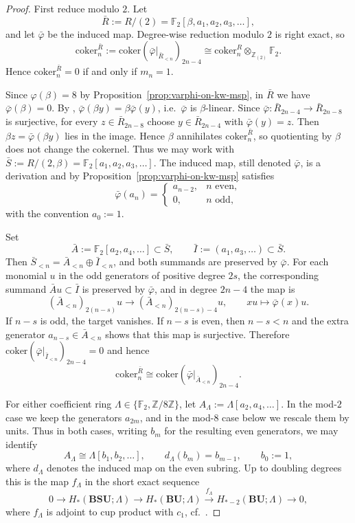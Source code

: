 \documentclass[a4paper]{amsart}
\theoremstyle{plain}
\theoremstyle{definition}
\newcommand{\ZZ}{\mathbb{Z}}
\newcommand{\FF}{\mathbb{F}}
\newcommand{\coker}{\mathrm{coker}}
\begin{document}
\begin{proof}
	First reduce modulo $2$. Let
	\[
		\bar R:=R/(2)=\FF_2[\beta,a_1,a_2,a_3,\ldots],
	\]
	and let $\bar\varphi$ be the induced map. Degree-wise reduction modulo $2$ is right exact, so
	\[
		\coker_n^{\bar R}:=\coker \left(\bar\varphi|_{\bar R_{<n}}\right)_{2n-4}\cong \coker_n^R\otimes_{\ZZ_{(2)}}\FF_2.
	\]
	Hence $\coker_n^{\bar R}=0$ if and only if $m_n=1$.

	Since $\varphi(\beta) = 8$ by Proposition~\ref{prop:varphi-on-kw-msp}, in $\bar R$ we have $\bar\varphi(\beta)=0$. By \cite[Lemma 8.3]{bachmann2021eta}, $\bar\varphi(\beta y)=\beta \bar\varphi(y)$, i.e.\ $\bar\varphi$ is $\beta$-linear. Since $\bar\varphi:\bar R_{2n-4}\to \bar R_{2n-8}$ is surjective, for every $z\in \bar R_{2n-8}$ choose $y\in \bar R_{2n-4}$ with $\bar\varphi(y)=z$. Then $\beta z=\bar\varphi(\beta y)$ lies in the image. Hence $\beta$ annihilates $\coker_n^{\bar R}$, so quotienting by $\beta$ does not change the cokernel. Thus we may work with $\bar S:=R/(2,\beta)=\FF_2[a_1,a_2,a_3,\ldots]$. The induced map, still denoted $\bar\varphi$, is a derivation and by Proposition~\ref{prop:varphi-on-kw-msp} satisfies
	\[
		\bar\varphi(a_n)= \begin{cases}
			a_{n-2}, & n \text{ even}, \\
			0,       & n \text{ odd},
		\end{cases}
	\]
	with the convention $a_0:=1$.

	Set
	\[
		\bar A:=\FF_2[a_2,a_4,\ldots]\subset \bar S,\qquad \bar I:=(a_1,a_3,\ldots)\subset \bar S.
	\]
	Then $\bar S_{<n}=\bar A_{<n}\oplus \bar I_{<n}$, and both summands are preserved by $\bar\varphi$. For each monomial $u$ in the odd generators of positive degree $2s$, the corresponding summand $\bar A u\subset \bar I$ is preserved by $\bar\varphi$, and in degree $2n-4$ the map is
	\[
		(\bar A_{<n})_{2(n-s)}u \to (\bar A_{<n})_{2(n-s)-4}u,\qquad xu\mapsto \bar\varphi(x)u.
	\]
	If $n-s$ is odd, the target vanishes. If $n-s$ is even, then $n-s<n$ and the extra generator $a_{n-s}\in \bar A_{<n}$ shows that this map is surjective. Therefore $\coker \left(\bar\varphi|_{\bar I_{<n}}\right)_{2n-4}=0$ and hence
	\[
		\coker_n^{\bar R}\cong \coker \left(\bar\varphi|_{\bar A_{<n}}\right)_{2n-4}.
	\]

	For either coefficient ring $\Lambda\in\{\FF_2,\ZZ/8\ZZ\}$, let $A_{\Lambda}:=\Lambda[a_2,a_4,\ldots]$. In the mod-$2$ case we keep the generators $a_{2m}$, and in the mod-$8$ case below we rescale them by units. Thus in both cases, writing $b_m$ for the resulting even generators, we may identify
	\[
		A_{\Lambda}\cong \Lambda[b_1,b_2,\ldots],\qquad d_{\Lambda}(b_m)=b_{m-1},\qquad b_0:=1,
	\]
	where $d_{\Lambda}$ denotes the induced map on the even subring. Up to doubling degrees this is the map $f_{\Lambda}$ in the short exact sequence
	\[
		0 \to H_*(\mathbf{BSU};\Lambda) \to H_*(\mathbf{BU};\Lambda) \xrightarrow{f_{\Lambda}} H_{*-2}(\mathbf{BU};\Lambda) \to 0,
	\]
	where $f_{\Lambda}$ is adjoint to cup product with $c_1$, cf.~\cite[Proposition 1.5]{kozima1987on}.


\end{proof}
\end{document}
